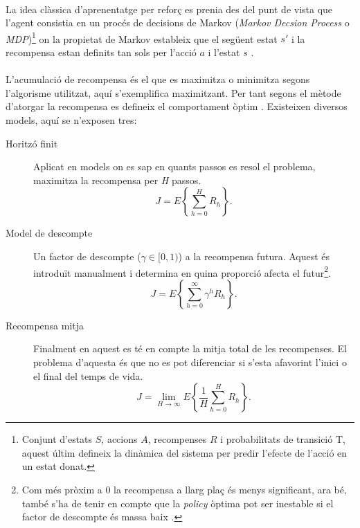 \documentclass[12pt,a4paper,final,twoside]{article}
\begin{document}
\paragraph{}La idea clàssica d'aprenentatge per reforç es prenia des del punt de vista que l'agent consistia en un procés de decisions de Markov (\textit{Markov Decsion Process} o \textit{MDP})\footnote{Conjunt d'estats $S$, accions $A$, recompenses $R$ i probabilitats de transició T, aquest últim defineix la dinàmica del sistema per predir l'efecte de l'acció en un estat donat.} on la propietat de Markov estableix que el següent estat $s'$ i la recompensa estan definits tan sols per l'acció $a$ i l'estat $s$ \cite{Sutton1998}. %


\paragraph{}L'acumulació de recompensa és el que es maximitza o minimitza segons l'algorisme utilitzat, aquí s'exemplifica maximitzant. Per tant segons el mètode d'atorgar la recompensa es defineix el comportament òptim \cite{Kober2009}. Existeixen diversos models, aquí se n'exposen tres:
\begin{description}


\item[Horitzó finit] Aplicat en models on es sap en quants passos es resol el problema, maximitza la recompensa per \textit{H} passos.
\begin{equation}
J=E\left\{ \sum_{h=0}^{H} R_{h} \right\}.
\end{equation}

\item[Model de descompte] Un factor de descompte ($\gamma\in[0,1)$) a la recompensa futura. Aquest és introduït manualment i determina en quina proporció afecta el futur\footnote{Com més pròxim a 0 la recompensa a llarg plaç és menys significant, ara bé, també s'ha de tenir en compte que la \textit{policy} òptima pot ser inestable si el factor de descompte és massa baix \cite{Kober2009}.}.
\begin{equation}
J=E\left\{ \sum_{h=0}^{\infty} \gamma^h R_{h} \right\}.
\end{equation}

\item[Recompensa mitja] Finalment en aquest es té en compte la mitja total de les recompenses. El problema d'aquesta és que no es pot diferenciar si s'esta afavorint l'inici o el final del temps de vida.
\begin{equation}
J=\lim_{H \to \infty} E\left\{ \frac{1}{H}\sum_{h=0}^{H} R_{h} \right\}.
\end{equation} 

\end{description}
\end{document}
